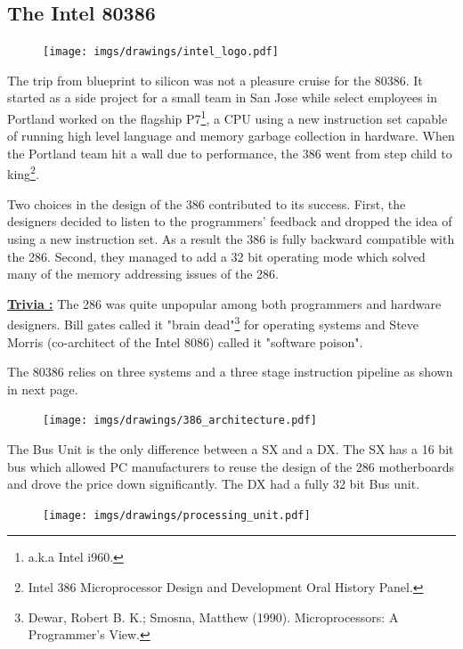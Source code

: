 \documentclass[book.tex]{subfiles}
\begin{document}
\subsection{The Intel 80386}
  \begin{figure}
\centering
\texttt{[image: imgs/drawings/intel\_logo.pdf]}
\end{figure}
The trip from blueprint to silicon was not a pleasure cruise for the 80386. It started as a side project for a small team in San Jose while select employees in Portland worked on the flagship P7\footnote{a.k.a Intel i960.}, a CPU using a new instruction set capable of running high level language and memory garbage collection in hardware. When the Portland team hit a wall due to performance, the 386 went from step child to king\footnote{Intel 386 Microprocessor Design and Development Oral History Panel.}.\\
\par
Two choices in the design of the 386 contributed to its success. First, the designers decided to listen to the programmers' feedback and dropped the idea of using a new instruction set. As a result the 386 is fully backward compatible with the 286. Second, they managed to add a 32 bit operating mode which solved many of the memory addressing issues of the 286.\\
\par
\textbf{\underline{Trivia :}}  The 286 was quite unpopular among both programmers and hardware designers. Bill gates called it "brain dead"\footnote{Dewar, Robert B. K.; Smosna, Matthew (1990). Microprocessors: A Programmer's View.} for operating systems and Steve Morris (co-architect of the Intel 8086) called it "software poison".\\
\par
The 80386 relies on three systems and a three stage instruction pipeline as shown in next page.\\
\par
\begin{figure}[H]
\centering
\texttt{[image: imgs/drawings/386\_architecture.pdf]}
\end{figure}
\par
The Bus Unit is the only difference between a SX and a DX. The SX has a 16 bit bus which allowed PC manufacturers to reuse the design of the 286 motherboards and drove the price down significantly. The DX had a fully 32 bit Bus unit.
\par
\begin{figure}[H]
\centering
\texttt{[image: imgs/drawings/processing\_unit.pdf]}
\end{figure}
\end{document}
